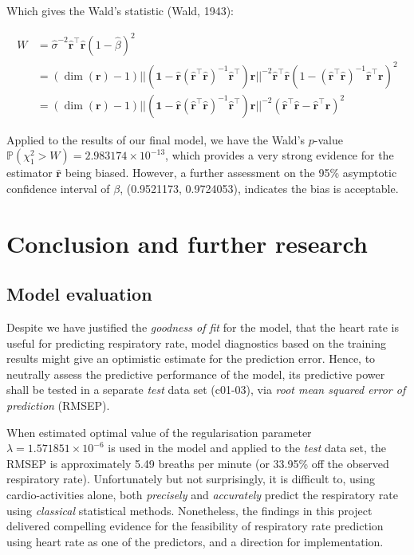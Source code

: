 \documentclass[
]{article}
\begin{document}
Which gives the Wald's statistic (Wald, 1943):

\begin{align*}
  W &= \hat{\sigma}^{-2}\mathbf{\hat{r}}^\top\mathbf{\hat{r}}(1 - \hat{\beta})^2 \\
  &= (\dim(\mathbf{r}) - 1) ||(\mathbf{1} - \mathbf{\hat{r}}(\mathbf{\hat{r}}^\top\mathbf{\hat{r}})^{-1}\mathbf{\hat{r}}^\top)\mathbf{r}||^{-2}\mathbf{\hat{r}}^\top\mathbf{\hat{r}}(1 - (\mathbf{\hat{r}}^\top\mathbf{\hat{r}})^{-1}\mathbf{\hat{r}}^\top\mathbf{r})^2 \\
  &= (\dim(\mathbf{r}) - 1) ||(\mathbf{1} - \mathbf{\hat{r}}(\mathbf{\hat{r}}^\top\mathbf{\hat{r}})^{-1}\mathbf{\hat{r}}^\top)\mathbf{r}||^{-2}(\mathbf{\hat{r}}^\top\mathbf{\hat{r}} - \mathbf{\hat{r}}^\top\mathbf{r})^2
\end{align*}

Applied to the results of our final model, we have the Wald's
\(p\)-value \(\mathbb{P}(\chi_1^2 > W) = 2.983174 \times 10^{-13}\),
which provides a very strong evidence for the estimator
\(\mathbf{\hat{r}}\) being biased. However, a further assessment on the
95\% asymptotic confidence interval of \(\beta\), (0.9521173,
0.9724053), indicates the bias is acceptable.

\hypertarget{conclusion-and-further-research}{%
\section{Conclusion and further
research}\label{conclusion-and-further-research}}

\hypertarget{model-evaluation}{%
\subsection{Model evaluation}\label{model-evaluation}}

Despite we have justified the \emph{goodness of fit} for the model, that
the heart rate is useful for predicting respiratory rate, model
diagnostics based on the training results might give an optimistic
estimate for the prediction error. Hence, to neutrally assess the
predictive performance of the model, its predictive power shall be
tested in a separate \emph{test} data set (c01-03), via \emph{root mean
squared error of prediction} (RMSEP).

When estimated optimal value of the regularisation parameter
\(\lambda = 1.571851 \times 10^{-6}\) is used in the model and applied
to the \emph{test} data set, the RMSEP is approximately 5.49 breaths per
minute (or 33.95\% off the observed respiratory rate). Unfortunately but
not surprisingly, it is difficult to, using cardio-activities alone,
both \emph{precisely} and \emph{accurately} predict the respiratory rate
using \emph{classical} statistical methods. Nonetheless, the findings in
this project delivered compelling evidence for the feasibility of
respiratory rate prediction using heart rate as one of the predictors,
and a direction for implementation.
\end{document}
